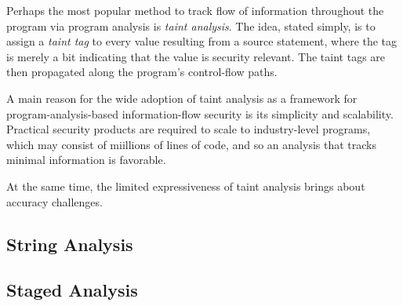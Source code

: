 Perhaps the most popular method to track flow of information throughout the program via program analysis is \emph{taint analysis}. The idea, stated simply, is to assign a \emph{taint tag} to every value resulting from a source statement, where the tag is merely a bit indicating that the value is security relevant. The taint tags are then propagated along the program's control-flow paths.

A main reason for the wide adoption of taint analysis as a framework for program-analysis-based information-flow security is its simplicity and scalability. Practical security products are required to scale to industry-level programs, which may consist of miillions of lines of code, and so an analysis that tracks minimal information is favorable.

At the same time, the limited expressiveness of taint analysis brings about accuracy challenges. 

\subsection{String Analysis}

\subsection{Staged Analysis}

